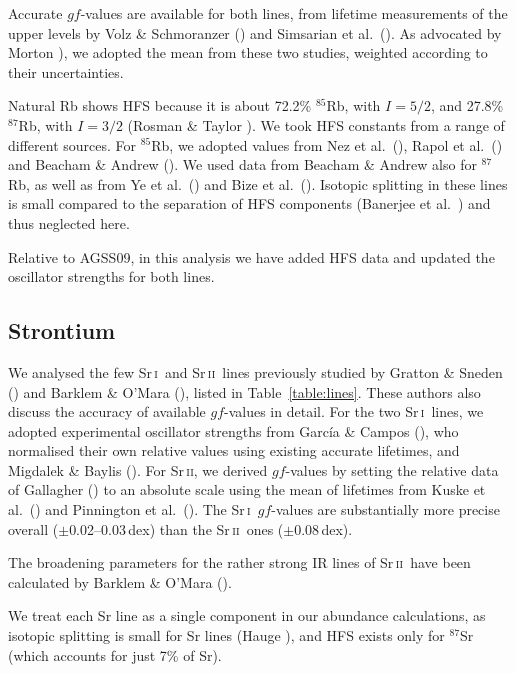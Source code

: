 \documentclass[traditabstract]{aa}
\newcommand{\altsri}{Sr\,\textsc{i}}
\newcommand{\altsrii}{Sr\,\textsc{ii}}
\newcommand{\sri}{\altsri\ }
\newcommand{\srii}{\altsrii\ }
\begin{document}
Accurate $gf$-values are available for both lines, from lifetime measurements of the upper levels by Volz \& Schmoranzer (\cite{vol}) and Simsarian et al.\ (\cite{sim}).  As advocated by Morton \cite{Morton00}), we adopted the mean from these two studies, weighted according 
to their uncertainties.

Natural Rb shows HFS because it is about 72.2\% $^{85}$Rb, with $I=5/2$, and 27.8\% $^{87}$Rb, with $I=3/2$ (Rosman \& Taylor \cite{IUPAC98}).  We took HFS constants from a range of different sources.  For $^{85}$Rb, we adopted values from Nez et al.\ (\cite{nez}), Rapol et al.\ (\cite{rapol}) and Beacham \& Andrew (\cite{beach}).  We used data from Beacham \& Andrew also for $^{87}$Rb, as well as from Ye et al.\ (\cite{ye}) and Bize et al.\ (\cite{bize}).  Isotopic splitting in these lines is small compared to the separation of HFS components (Banerjee et al.\ \cite{banerjee}) and thus neglected here.

Relative to AGSS09, in this analysis we have added HFS data and updated the oscillator strengths for both lines.

\subsection{Strontium}
We analysed the few \sri and \srii lines previously studied by Gratton \& Sneden (\cite{grat}) and Barklem \& O'Mara (\cite{bark2}), listed in Table~\ref{table:lines}. These authors also discuss the accuracy of available $gf$-values in detail.  For the two \sri lines, we adopted experimental oscillator strengths from García \& Campos (\cite{garc}), who normalised their own relative values using existing accurate lifetimes, and Migdalek \& Baylis (\cite{Migdalek}). For \altsrii, we derived $gf$-values by setting the relative data of Gallagher (\cite{Gallagher}) to an absolute scale using the mean of lifetimes from Kuske et al.\ (\cite{Kuske}) and Pinnington et al.\ (\cite{Pinnington95}).  The \sri $gf$-values are substantially more precise overall ($\pm$0.02--0.03\,dex) than the \srii ones ($\pm$0.08\,dex). 

The broadening parameters for the rather strong IR lines of \srii have been calculated by Barklem \& O'Mara (\cite{bark2}).

We treat each Sr line as a single component in our abundance calculations, as isotopic splitting is small for Sr lines (Hauge \cite{hauge2}), and HFS exists only for $^{87}$Sr (which accounts for just 7\% of Sr).
\end{document}
